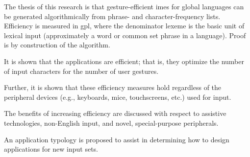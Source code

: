 The thesis of this research is that gesture-efficient \glspl{ime} for global
languages can be generated algorithmically from phrase- and character-frequency
lists. Efficiency is measured in \gls{gpl}, where the denominator \gls{lexeme}
is the basic unit of lexical input (approximately a word or common set phrase in
a language). Proof is by construction of the algorithm.

It is shown that the applications are efficient; that is, they optimize the number of input characters for the number
of user gestures.

Further, it is shown that these efficiency measures hold regardless of the peripheral devices (e.g., keyboards,
mice, touchscreens, etc.) used for input.

The benefits of increasing efficiency are discussed with respect to assistive technologies, non-English input,
and novel, special-purpose peripherals.

An application typology is proposed to assist in determining how to design applications for new input sets.
